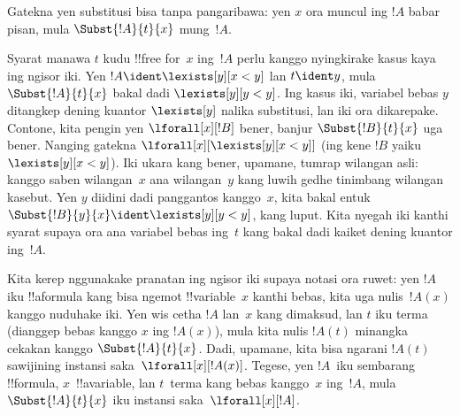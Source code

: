 \documentclass[../../../include/open-logic-section]{subfiles}
\begin{document}
\begin{explain}
Gatekna yen substitusi bisa tanpa pangaribawa: yen $x$ ora muncul ing
$!A$ babar pisan, mula $\Subst{!A}{t}{x}$ mung~$!A$.

Syarat manawa $t$ kudu !!{free for}~$x$ ing~$!A$ perlu kanggo
nyingkirake kasus kaya ing ngisor iki. Yen $!A \ident \lexists[y][x < y]$
lan $t \ident y$, mula $\Subst{!A}{t}{x}$ bakal dadi $\lexists[y][y <
  y]$. Ing kasus iki, variabel bebas $y$ ditangkep dening
kuantor $\lexists[y]$ nalika substitusi, lan iki ora dikarepake.
Contone, kita pengin yen $\lforall[x][!B]$ bener, banjur
$\Subst{!B}{t}{x}$ uga bener. Nanging gatekna
$\lforall[x][\lexists[y][x < y]]$ (ing kene $!B$ yaiku $\lexists[y][x <
  y]$). Iki ukara kang bener, upamane, tumrap wilangan asli:
kanggo saben wilangan~$x$ ana wilangan~$y$ kang luwih gedhe tinimbang
wilangan kasebut. Yen $y$ diidini dadi panggantos kanggo~$x$, kita bakal entuk
$\Subst{!B}{y}{x} \ident \lexists[y][y < y]$, kang luput. Kita
nyegah iki kanthi syarat supaya ora ana variabel bebas ing~$t$ kang
bakal dadi kaiket dening kuantor ing~$!A$.
\end{explain}

Kita kerep nggunakake pranatan ing ngisor iki supaya notasi ora
ruwet: yen $!A$ iku !!a{formula} kang bisa ngemot !!{variable}~$x$
kanthi bebas, kita uga nulis~$!A(x)$ kanggo nuduhake iki. Yen wis
cetha $!A$ lan~$x$ kang dimaksud, lan $t$ iku terma (dianggep bebas
kanggo $x$ ing $!A(x)$), mula kita nulis $!A(t)$ minangka cekakan
kanggo $\Subst{!A}{t}{x}$. Dadi, upamane, kita bisa ngarani
$!A(t)$ sawijining instansi saka~$\lforall[x][!A(x)]$.
Tegese, yen $!A$~iku sembarang !!{formula}, $x$~!!a{variable},
lan $t$~terma kang bebas kanggo~$x$ ing~$!A$, mula
$\Subst{!A}{t}{x}$ iku instansi saka~$\lforall[x][!A]$.
\end{document}
